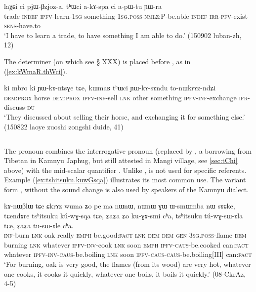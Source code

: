    \begin{exe}
\ex \label{ex:thWthAci.akAspa}
\gll 
 laχɕi ci pjɯ-βzjoz-a, tʰɯci a-kɤ-spa ci a-pɯ-tu ɲɯ-ra  \\
 trade \textsc{indef} \textsc{ipfv}-learn-\textsc{1sg} something \textsc{1sg.poss-nmlz:P}-be.able \textsc{indef} \textsc{irr-pfv}-exist \textsc{sens}-have.to \\
 \glt `I have to learn a trade, to have something I am able to do.' (150902 luban-zh, 12)
 \end{exe}
 
The determiner  (on which see § XXX) is placed before , as in (\ref{ex:kWmaR.thWci}). 
 
\begin{exe}
\ex \label{ex:kWmaR.thWci}
\gll    ki mbro ki ɲɯ-kɤ-ntsɣe tɕe, kɯmaʁ tʰɯci ɲɯ-kɤ-sɤndu to-nɯkrɤz-ndʑi \\
\textsc{dem:prox} horse \textsc{dem:prox} \textsc{ipfv-inf}-sell \textsc{lnk} other  something   \textsc{ipfv-inf}-exchange \textsc{ifr}-discuss-\textsc{du} \\
 \glt `They discussed about selling their horse, and exchanging it for something else.' (150822 laoye zuoshi zongshi duide, 41)
\end{exe}


\subsection{} \label{sec:tshitsuku}
The pronoun  combines the  interrogative pronoun  (replaced by , a borrowing from Tibetan in Kamnyu Japhug, but still attested in Mangi village, see \ref{sec:tChi} above) with the mid-scalar quantifier  .  Unlike  , is not used for specific referents.  Example (\ref{ex:tshitsuku.kuwGsqa}) illustrates its most common use. The variant form , without the sound change  \fl{}  is also used by speakers of the Kamnyu dialect.

\begin{exe}
\ex \label{ex:tshitsuku.kuwGsqa}
\gll  
kɤ-nɯβlɯ tɕe ɕkrɤz wuma ʑo pe ma nɯnɯ, nɯnɯ ɣɯ ɯ-smɯmba nɯ sɤɕke, tɕendɤre tsʰitsuku kú-wɣ-sqa tɕe, ʑaʑa ʑo ku-ɣɤ-smi cʰa, tsʰitsuku tú-wɣ-sɯ-ɤla tɕe, ʑaʑa tu-sɯ-ɤle cʰa. \\
\textsc{inf}-burn \textsc{lnk} oak really \textsc{emph} be.good:\textsc{fact} \textsc{lnk} \textsc{dem} \textsc{dem} \textsc{gen} \textsc{3sg.poss}-flame \textsc{dem} burning \textsc{lnk} whatever \textsc{ipfv-inv}-cook \textsc{lnk} soon \textsc{emph}  \textsc{ipfv-caus}-be.cooked can:\textsc{fact} whatever \textsc{ipfv-inv-caus}-be.boiling \textsc{lnk} soon  \textsc{ipfv-caus-caus}-be.boiling[III] can:\textsc{fact} \\
\glt `For burning, oak is very good, the flames (from its wood) are very hot, whatever one cooks, it cooks it quickly, whatever one boils, it boils it quickly.' (08-CkrAz, 4-5)
\end{exe}
 
